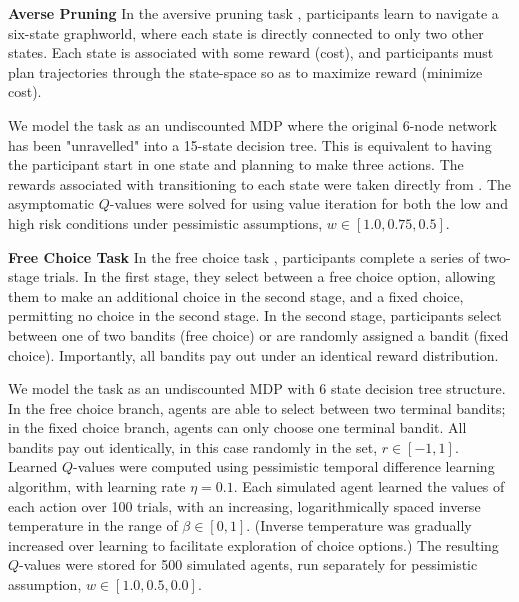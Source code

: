 \documentclass[11pt]{article} %
\begin{document}
\textbf{Averse Pruning} In the aversive pruning task \citep{Huys2012, Lally2017}, participants learn to navigate a six-state graphworld, where each state is directly connected to only two other states. Each state is associated with some reward (cost), and participants must plan trajectories through the state-space so as to maximize reward (minimize cost). 

We model the task as an undiscounted MDP where the original 6-node network has been "unravelled" into a 15-state decision tree. This is equivalent to having the participant start in one state and planning to make three actions. The rewards associated with transitioning to each state were taken directly from \citep{Huys2012, Lally2017}. The asymptomatic $Q$-values were solved for using value iteration for both the low and high risk conditions under pessimistic assumptions, $w \in [1.0, 0.75, 0.5]$.

\textbf{Free Choice Task} In the free choice task \citep{Leotti2011}, participants complete a series of two-stage trials. In the first stage, they select between a free choice option, allowing them to make an additional choice in the second stage, and a fixed choice, permitting no choice in the second stage. In the second stage, participants select between one of two bandits (free choice) or are randomly assigned a bandit (fixed choice). Importantly, all bandits pay out under an identical reward distribution. 

We model the task as an undiscounted MDP with 6 state decision tree structure. In the free choice branch, agents are able to select between two terminal bandits; in the fixed choice branch, agents can only choose one terminal bandit. All bandits pay out identically, in this case randomly in the set, $r \in [-1, 1]$. Learned $Q$-values were computed using pessimistic temporal difference learning algorithm, with learning rate $\eta = 0.1$. Each simulated agent learned the values of each action over 100 trials, with an increasing, logarithmically spaced inverse temperature in the range of $\beta \in [0, 1]$. (Inverse temperature was gradually increased over learning to facilitate exploration of choice options.) The resulting $Q$-values were stored for 500 simulated agents, run separately for pessimistic assumption, $w \in [1.0, 0.5, 0.0]$. 


\small{}
\end{document}
